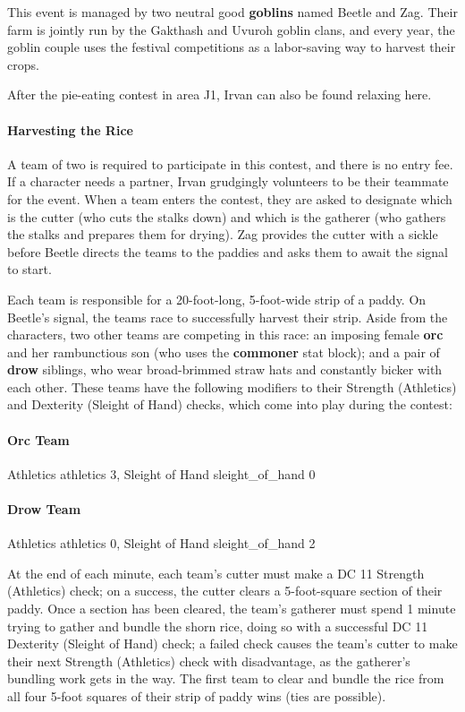 \documentclass[letterpaper, 11pt, bg=full, twocolumn]{dndbook}
\begin{document}
This event is managed by two neutral good \textbf{goblins} named Beetle and Zag. Their farm is jointly run by the Gakthash and Uvuroh goblin clans, and every year, the goblin couple uses the festival competitions as a labor-saving way to harvest their crops.

After the pie-eating contest in area J1, Irvan can also be found relaxing here.

\paragraph{Harvesting the Rice}

A team of two is required to participate in this contest, and there is no entry fee. If a character needs a partner, Irvan grudgingly volunteers to be their teammate for the event. When a team enters the contest, they are asked to designate which is the cutter (who cuts the stalks down) and which is the gatherer (who gathers the stalks and prepares them for drying). Zag provides the cutter with a sickle before Beetle directs the teams to the paddies and asks them to await the signal to start.

Each team is responsible for a 20-foot-long, 5-foot-wide strip of a paddy. On Beetle's signal, the teams race to successfully harvest their strip. Aside from the characters, two other teams are competing in this race: an imposing female \textbf{orc} and her rambunctious son (who uses the \textbf{commoner} stat block); and a pair of \textbf{drow} siblings, who wear broad-brimmed straw hats and constantly bicker with each other. These teams have the following modifiers to their Strength (Athletics) and Dexterity (Sleight of Hand) checks, which come into play during the contest:

\paragraph{Orc Team}

Athletics athletics 3, Sleight of Hand sleight\_of\_hand 0

\paragraph{Drow Team}

Athletics athletics 0, Sleight of Hand sleight\_of\_hand 2

At the end of each minute, each team's cutter must make a DC 11 Strength (Athletics) check; on a success, the cutter clears a 5-foot-square section of their paddy. Once a section has been cleared, the team's gatherer must spend 1 minute trying to gather and bundle the shorn rice, doing so with a successful DC 11 Dexterity (Sleight of Hand) check; a failed check causes the team's cutter to make their next Strength (Athletics) check with disadvantage, as the gatherer's bundling work gets in the way. The first team to clear and bundle the rice from all four 5-foot squares of their strip of paddy wins (ties are possible).
\end{document}
